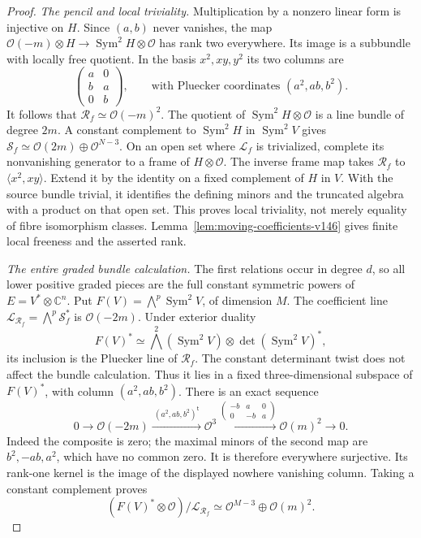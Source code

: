 \documentclass[11pt,reqno]{amsart}
\numberwithin{equation}{section}
\theoremstyle{definition}\newtheorem{definition}[theorem]{Definition}
\theoremstyle{remark}\newtheorem{remark}[theorem]{Remark}
\newcommand{\C}{\mathbb C}\newcommand{\Q}{\mathbb Q}
\newcommand{\OO}{\mathcal O}\newcommand{\II}{\mathcal I}
\DeclareMathOperator{\Sym}{Sym}\DeclareMathOperator{\Gr}{Gr}
\begin{document}
\begin{proof}
\emph{The pencil and local triviality.}
Multiplication by a nonzero linear form is injective on \(H\).
Since \((a,b)\) never vanishes, the map
\(\OO(-m)\otimes H\to\Sym^2H\otimes\OO\) has rank
two everywhere.  Its image is a subbundle with locally free
quotient.  In the basis \(x^2,xy,y^2\) its two columns are
\begin{equation}\label{eq:cover-columns-v148}
                 \begin{pmatrix}a&0\\ b&a\\0&b\end{pmatrix},
 \qquad\text{with Pluecker coordinates }(a^2,ab,b^2).
\end{equation}
It follows that \(\mathcal R_f\simeq\OO(-m)^2\).
The quotient of \(\Sym^2H\otimes\OO\) is a line bundle
of degree \(2m\).  A constant complement to \(\Sym^2H\)
in \(\Sym^2V\) gives
\(\mathcal S_f\simeq\OO(2m)\oplus\OO^{N-3}\).
On an open set where \(\mathcal L_f\) is trivialized, complete
its nonvanishing generator to a frame of \(H\otimes\OO\).
The inverse frame map takes \(\mathcal R_f\) to
\(\langle x^2,xy\rangle\).  Extend it by the identity on a
fixed complement of \(H\) in \(V\).  With the source bundle
trivial, it identifies the defining minors and the truncated
algebra with a product on that open set.  This proves local
triviality, not merely equality of fibre isomorphism classes.
Lemma~\ref{lem:moving-coefficients-v146} gives finite local
freeness and the asserted rank.

\emph{The entire graded bundle calculation.}
The first relations occur in degree \(d\), so all lower
positive graded pieces are the full constant symmetric powers of
\(E=V^*\otimes\C^n\).  Put
\(F(V)=\bigwedge^p\Sym^2V\), of dimension \(M\).
The coefficient line
\(\mathcal L_{\mathcal R_f}=\bigwedge^p\mathcal S_f^*\)
is \(\OO(-2m)\).  Under exterior duality
\[
 F(V)^*\simeq\bigwedge^2(\Sym^2V)
                              \otimes\det(\Sym^2V)^*,
\]
its inclusion is the Pluecker line of \(\mathcal R_f\).
The constant determinant twist does not affect the bundle
calculation.  Thus it lies in a fixed three-dimensional subspace
of \(F(V)^*\), with column \((a^2,ab,b^2)\).
There is an exact sequence
\begin{equation}\label{eq:conic-quotient-v148}
 0\longrightarrow\OO(-2m)
 \xrightarrow{\ (a^2,ab,b^2)^{\mathsf t}\ }\OO^3
 \xrightarrow{\left(\begin{smallmatrix}-b&a&0\\0&-b&a\end{smallmatrix}\right)}
                  \OO(m)^2\longrightarrow0.
\end{equation}
Indeed the composite is zero; the maximal minors of the second
map are \(b^2,-ab,a^2\), which have no common zero.  It is
therefore everywhere surjective.  Its rank-one kernel is the
image of the displayed nowhere vanishing column.  Taking a
constant complement proves
\begin{equation}\label{eq:coefficient-quotient-v148}
 (F(V)^*\otimes\OO)/\mathcal L_{\mathcal R_f}
                   \simeq\OO^{M-3}\oplus\OO(m)^2.
\end{equation}


\end{proof}
\end{document}
